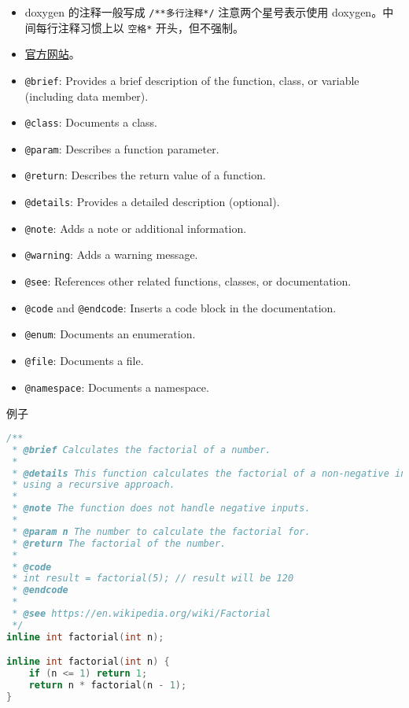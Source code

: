 
\begin{itemize}
\item doxygen 的注释一般写成 \verb`/**多行注释*/` 注意两个星号表示使用 doxygen。中间每行注释习惯上以 \verb`空格*` 开头，但不强制。
\item \href{https://www.doxygen.nl/}{官方网站}。
\item \verb`@brief`: Provides a brief description of the function, class, or variable (including data member).
\item \verb`@class`: Documents a class.
\item \verb`@param`: Describes a function parameter.
\item \verb`@return`: Describes the return value of a function.
\item \verb`@details`: Provides a detailed description (optional).
\item \verb`@note`: Adds a note or additional information.
\item \verb`@warning`: Adds a warning message.
\item \verb`@see`: References other related functions, classes, or documentation.
\item \verb`@code` and \verb`@endcode`: Inserts a code block in the documentation.
\item \verb`@enum`: Documents an enumeration.
\item \verb`@file`: Documents a file.
\item \verb`@namespace`: Documents a namespace.
\end{itemize}

例子
\begin{lstlisting}[language=cpp,caption=factorial.hpp]
/**
 * @brief Calculates the factorial of a number.
 *
 * @details This function calculates the factorial of a non-negative integer
 * using a recursive approach.
 *
 * @note The function does not handle negative inputs.
 *
 * @param n The number to calculate the factorial for.
 * @return The factorial of the number.
 *
 * @code
 * int result = factorial(5); // result will be 120
 * @endcode
 *
 * @see https://en.wikipedia.org/wiki/Factorial
 */
inline int factorial(int n);

inline int factorial(int n) {
    if (n <= 1) return 1;
    return n * factorial(n - 1);
}
\end{lstlisting}

